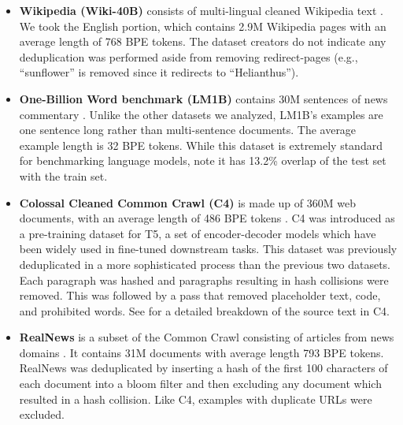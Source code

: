 \begin{itemize}
\item \textbf{Wikipedia (Wiki-40B)}
consists of multi-lingual cleaned Wikipedia text \citep{guo2020wiki40b}.
We took the English portion, which contains 2.9M Wikipedia pages with an average length of 768 BPE tokens.
The dataset creators do not indicate any deduplication was performed aside from removing redirect-pages (e.g., ``sunflower'' is removed since it redirects to ``Helianthus'').

\item \textbf{One-Billion Word benchmark (LM1B)}  contains 30M sentences of news commentary \citep{chelba2013one}.
Unlike the other datasets we analyzed, LM1B's examples are one sentence long rather than multi-sentence documents.
The average example length is 32 BPE tokens.
While this dataset is extremely standard for benchmarking language models, \citet[Sec 4]{radford2019language} note it has 13.2\% overlap of the test set with the train set.

\item \textbf{Colossal Cleaned Common Crawl (C4)}
is made up of 360M web documents, with an average length of 486 BPE tokens \citep{raffel2019exploring}.
C4 was introduced as a pre-training dataset for T5, a set of encoder-decoder models which have been widely used in fine-tuned downstream tasks.
This dataset was previously deduplicated in a more sophisticated process
than the previous two datasets.
Each paragraph was hashed and paragraphs resulting in hash collisions were removed.
This was followed by a pass that removed placeholder text, code, and prohibited words.
See \citet{dodge2021documenting} for a detailed breakdown of the source text in C4.

\item \textbf{RealNews}
is a subset of the Common Crawl consisting of articles from news domains \citep{zellers2019defending}.
It contains 31M documents with average length 793 BPE tokens.
RealNews was deduplicated by inserting a hash of the first 100 characters of each document into a bloom filter \citep{bloom1970space} and then excluding any document which resulted in a hash collision.
Like C4, examples with duplicate URLs were excluded.

\end{itemize}

